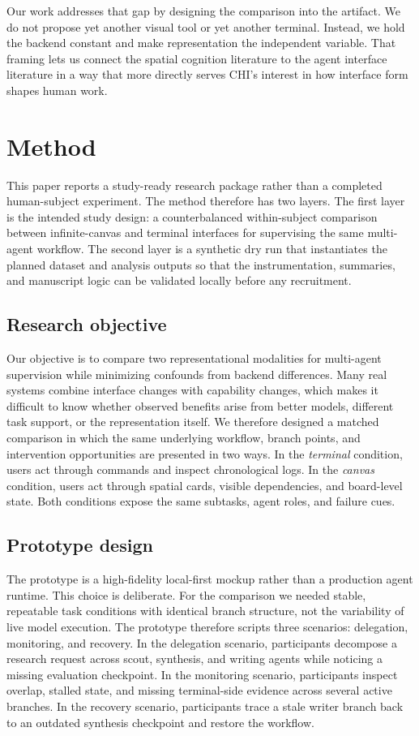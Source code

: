 \documentclass[sigconf]{acmart}
\begin{document}
Our work addresses that gap by designing the comparison into the artifact. We do not propose yet another visual tool or yet another terminal. Instead, we hold the backend constant and make representation the independent variable. That framing lets us connect the spatial cognition literature to the agent interface literature in a way that more directly serves CHI's interest in how interface form shapes human work.

\section{Method}
This paper reports a study-ready research package rather than a completed human-subject experiment. The method therefore has two layers. The first layer is the intended study design: a counterbalanced within-subject comparison between infinite-canvas and terminal interfaces for supervising the same multi-agent workflow. The second layer is a synthetic dry run that instantiates the planned dataset and analysis outputs so that the instrumentation, summaries, and manuscript logic can be validated locally before any recruitment.

\subsection{Research objective}

Our objective is to compare two representational modalities for multi-agent supervision while minimizing confounds from backend differences. Many real systems combine interface changes with capability changes, which makes it difficult to know whether observed benefits arise from better models, different task support, or the representation itself. We therefore designed a matched comparison in which the same underlying workflow, branch points, and intervention opportunities are presented in two ways. In the \emph{terminal} condition, users act through commands and inspect chronological logs. In the \emph{canvas} condition, users act through spatial cards, visible dependencies, and board-level state. Both conditions expose the same subtasks, agent roles, and failure cues.

\subsection{Prototype design}

The prototype is a high-fidelity local-first mockup rather than a production agent runtime. This choice is deliberate. For the comparison we needed stable, repeatable task conditions with identical branch structure, not the variability of live model execution. The prototype therefore scripts three scenarios: delegation, monitoring, and recovery. In the delegation scenario, participants decompose a research request across scout, synthesis, and writing agents while noticing a missing evaluation checkpoint. In the monitoring scenario, participants inspect overlap, stalled state, and missing terminal-side evidence across several active branches. In the recovery scenario, participants trace a stale writer branch back to an outdated synthesis checkpoint and restore the workflow.
\end{document}
